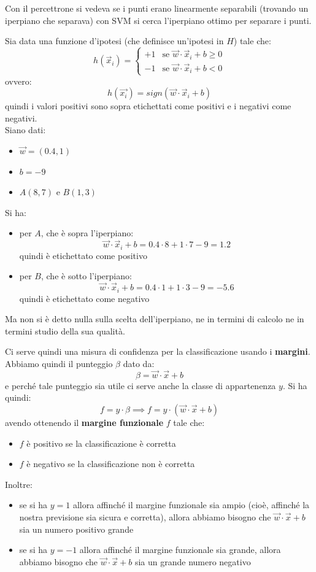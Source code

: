 Con il percettrone si vedeva se i punti erano linearmente separabili (trovando
un iperpiano che separava) con SVM si cerca l'iperpiano ottimo per separare i
punti.
\begin{esempio}
  Sia data una funzione d'ipotesi (che definisce un'ipotesi in $H$) tale che:
  \[h(\vec{x}_i)=
    \begin{cases}
      +1&\mbox{se }\vec{w}\cdot\vec{x}_i+b\geq 0\\
      -1&\mbox{se }\vec{w}\cdot\vec{x}_i+b< 0
    \end{cases}
  \]
  ovvero:
  \[h(\vec{x_i})=sign(\vec{w}\cdot\vec{x}_i+b)\]
  quindi i valori positivi sono sopra etichettati come positivi e i negativi
  come  negativi.\\
  Siano dati:
  \begin{itemize}
    \item $\vec{w}=(0.4, 1)$
    \item $b=-9$
    \item $A(8, 7)$ e $B(1, 3)$
  \end{itemize}
  Si ha:
  \begin{itemize}
    \item per $A$, che è sopra l'iperpiano:
    \[\vec{w}\cdot\vec{x}_i+b=0.4\cdot 8+1\cdot 7-9=1.2\]
    quindi è etichettato come positivo
    \item per $B$, che è sotto l'iperpiano:
    \[\vec{w}\cdot\vec{x}_i+b=0.4\cdot 1+1\cdot 3-9=-5.6\]
    quindi è etichettato come negativo
  \end{itemize}
  Ma non si è detto nulla sulla scelta dell'iperpiano, ne in termini di calcolo
  ne in termini studio della sua qualità.
\end{esempio}
Ci serve quindi una misura di confidenza per la classificazione usando i
\textbf{margini}. \\
Abbiamo quindi il punteggio $\beta$ dato da:
\[\beta=\vec{w}\cdot\vec{x}+b\]
e perché tale punteggio sia utile ci serve anche la classe di appartenenza
$y$. Si ha quindi:
\[f=y\cdot\beta\implies f=y\cdot(\vec{w}\cdot\vec{x}+b)\]
avendo ottenendo il \textbf{margine funzionale} $f$ tale che:
\begin{itemize}
  \item $f$ è positivo se la classificazione è corretta
  \item $f$ è negativo se la classificazione non è corretta
\end{itemize}
Inoltre:
\begin{itemize}
  \item se si ha $y=1$ allora affinché il margine funzionale sia ampio (cioè,
  affinché la nostra previsione sia sicura e corretta), allora abbiamo bisogno
  che $\vec{w}\cdot\vec{x}+b$ sia un numero positivo grande 
  \item se si ha $y=-1$ allora affinché il margine funzionale sia grande, allora
  abbiamo bisogno che $\vec{w}\cdot\vec{x}+b$ sia un grande numero negativo 
\end{itemize}


